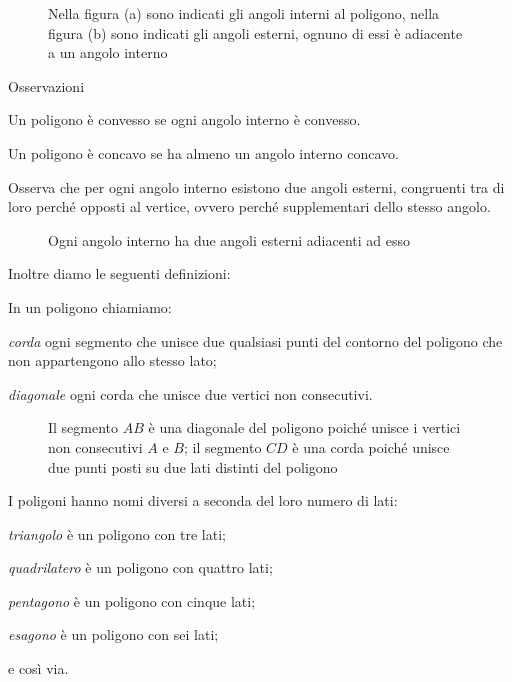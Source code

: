 \begin{figure}[htb]
\centering
\caption{Nella figura (a) sono indicati gli angoli interni al poligono, nella figura (b) sono indicati gli angoli esterni, ognuno di essi è adiacente a un angolo interno}
\end{figure}

Osservazioni
\begin{itemize*}
\item Un poligono è convesso se ogni angolo interno è convesso.
\item Un poligono è concavo se ha almeno un angolo interno concavo.
\end{itemize*}

Osserva che per ogni angolo interno esistono due angoli esterni, congruenti tra di loro perché opposti al vertice, ovvero perché supplementari dello stesso angolo.

\begin{figure}[htb]
\centering
\caption{Ogni angolo interno ha due angoli esterni adiacenti ad esso}
\end{figure}

Inoltre diamo le seguenti definizioni:
\begin{definizione}
In un poligono chiamiamo:
\begin{itemize*}
\item \emph{corda} ogni segmento che unisce due qualsiasi punti del contorno del poligono che non appartengono allo stesso lato;
\item \emph{diagonale} ogni corda che unisce due vertici non consecutivi.
\end{itemize*}
\end{definizione}

\begin{figure}[htb]
\centering
\caption{Il segmento $AB$ è una diagonale del poligono poiché unisce i vertici non consecutivi $A$ e $B$; il segmento $CD$ è una corda poiché unisce due punti posti su due lati distinti del poligono}
\end{figure}

I poligoni hanno nomi diversi a seconda del loro numero di lati:
\begin{itemize*}
\item \emph{triangolo} è un poligono con tre lati;
\item \emph{quadrilatero} è un poligono con quattro lati;
\item \emph{pentagono} è un poligono con cinque lati;
\item \emph{esagono} è un poligono con sei lati;
\item e così via.
\end{itemize*}


